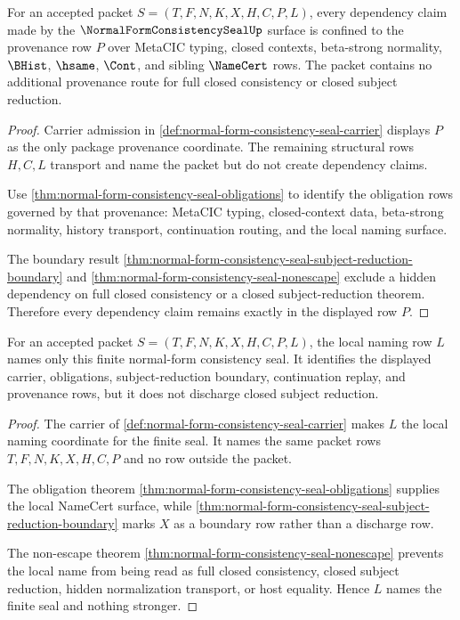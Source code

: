 \begin{theorem}
\label{thm:normal-form-consistency-seal-provenance-exactness}
For an accepted packet $S=(T,F,N,K,X,H,C,P,L)$, every dependency claim made by
the $\NormalFormConsistencySealUp$ surface is confined to the provenance row
$P$ over MetaCIC typing, closed contexts, beta-strong normality, $\BHist$,
$\hsame$, $\Cont$, and sibling $\NameCert$ rows. The packet contains no
additional provenance route for full closed consistency or closed subject
reduction.
\end{theorem}
\begin{proof}
Carrier admission in
\autoref{def:normal-form-consistency-seal-carrier} displays $P$ as the only
package provenance coordinate. The remaining structural rows $H,C,L$ transport
and name the packet but do not create dependency claims.

Use \autoref{thm:normal-form-consistency-seal-obligations} to identify the
obligation rows governed by that provenance: MetaCIC typing, closed-context
data, beta-strong normality, history transport, continuation routing, and the
local naming surface.

The boundary result
\autoref{thm:normal-form-consistency-seal-subject-reduction-boundary} and
\autoref{thm:normal-form-consistency-seal-nonescape} exclude a hidden
dependency on full closed consistency or a closed subject-reduction theorem.
Therefore every dependency claim remains exactly in the displayed row $P$.
\end{proof}

\begin{theorem}
\label{thm:normal-form-consistency-seal-local-naming-boundary}
For an accepted packet $S=(T,F,N,K,X,H,C,P,L)$, the local naming row $L$ names
only this finite normal-form consistency seal. It identifies the displayed
carrier, obligations, subject-reduction boundary, continuation replay, and
provenance rows, but it does not discharge closed subject reduction.
\end{theorem}
\begin{proof}
The carrier of \autoref{def:normal-form-consistency-seal-carrier} makes $L$
the local naming coordinate for the finite seal. It names the same packet rows
$T,F,N,K,X,H,C,P$ and no row outside the packet.

The obligation theorem
\autoref{thm:normal-form-consistency-seal-obligations} supplies the local
NameCert surface, while
\autoref{thm:normal-form-consistency-seal-subject-reduction-boundary} marks
$X$ as a boundary row rather than a discharge row.

The non-escape theorem
\autoref{thm:normal-form-consistency-seal-nonescape} prevents the local name
from being read as full closed consistency, closed subject reduction, hidden
normalization transport, or host equality. Hence $L$ names the finite seal and
nothing stronger.
\end{proof}

